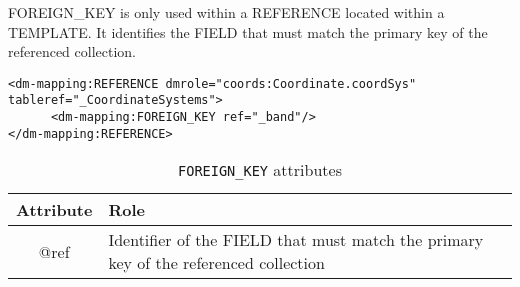 FOREIGN\_KEY is only used within a REFERENCE located within a TEMPLATE.
It identifies the FIELD that must  match the primary key of the referenced collection.

\begin{lstlisting}[frame=single,caption={The REFERENCE is resolved by the INSTANCE of table \_CoordinateSystems that has a primary key equals to the value of the column  \_band},style=XML,basicstyle=\tiny]
<dm-mapping:REFERENCE dmrole="coords:Coordinate.coordSys" tableref="_CoordinateSystems">
      <dm-mapping:FOREIGN_KEY ref="_band"/>
</dm-mapping:REFERENCE>
\end{lstlisting}

\begin{table}[!htbp]
\small
\centering
\begin{tabulary}{\linewidth}{|c|J|}       
       \hline 
            \textbf{Attribute} & 
            \textbf {Role}\\
       \hline         \hline  
             @ref& 
             Identifier of the FIELD that must  match the primary key of the referenced collection \\
     \hline
     \end{tabulary}
     \caption{\texttt{FOREIGN\_KEY} attributes} 
     \label{tbl:foreignkey-att}
 \end{table}
